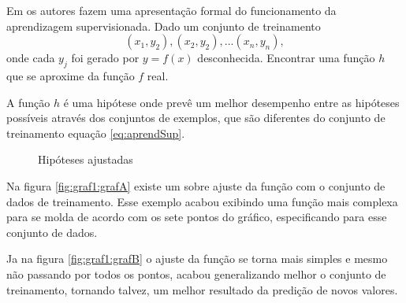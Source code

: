 Em \cite{RusselStuart.Norvig2013} os autores fazem uma apresentação formal do funcionamento da aprendizagem supervisionada. Dado um conjunto de treinamento 
\begin{equation}
 (x_{1},y_{2}),(x_{2},y_{2}),...(x_{n},y_{n}),
 \label{eq:aprendSup}
\end{equation}
onde cada ${y_{j}} $ foi gerado por ${y=f(x)}$ desconhecida. Encontrar uma função ${h}$ que se aproxime da função ${f}$ real.

A função ${h}$ é uma hipótese onde prevê um melhor desempenho entre as hipóteses possíveis através dos conjuntos de exemplos, que são diferentes do conjunto de treinamento equação \ref{eq:aprendSup}.

 \begin{figure}[h!]
    \centering
    \quad
    
    \caption{Hipóteses ajustadas} \label{fig:graf1}
        
\end{figure}

Na figura \ref{fig:graf1:grafA} existe um sobre ajuste da função com o conjunto de dados de treinamento. Esse exemplo acabou exibindo uma função mais complexa para se molda de acordo com os sete pontos do gráfico, especificando para esse conjunto de dados. 

Ja na figura \ref{fig:graf1:grafB} o ajuste da função se torna mais simples e mesmo não passando por todos os pontos, acabou generalizando melhor o conjunto de treinamento, tornando talvez, um melhor resultado da predição de novos valores. 

